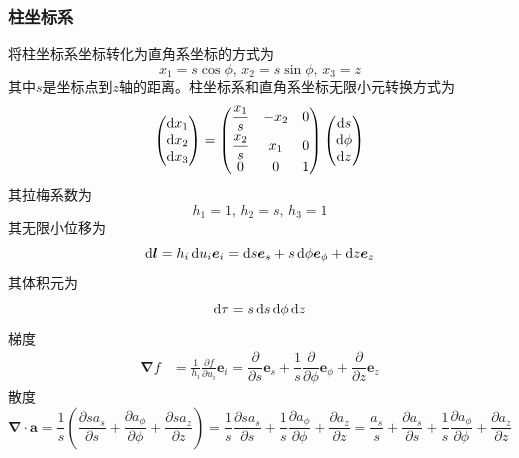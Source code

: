 \subsubsection{柱坐标系}
将柱坐标系坐标转化为直角系坐标的方式为
\begin{equation}
    x_1=s\cos\phi,\, x_2=s\sin\phi,\, x_3=z\label{柱坐标系坐标转化为直角系坐标}
\end{equation}
其中$s$是坐标点到$z$轴的距离。柱坐标系和直角系坐标无限小元转换方式为
\begin{equation}
    \begin{pmatrix}
        \dif{x}_1\\\dif{x}_2\\\dif{x}_3
    \end{pmatrix}=\begin{pmatrix}
        \dfrac{x_1}{s}&-x_2&0\\[6pt]
        \dfrac{x_2}{s}&x_1&0\\0&0&1
    \end{pmatrix}\begin{pmatrix}
        \dif{s}\\\dif{\phi}\\\dif z
    \end{pmatrix}
\end{equation}
其拉梅系数为
\begin{equation}
    h_1=1,\, h_2=s,\, h_3=1
\end{equation}
其无限小位移为
\begin{equation}
    \dif\boldsymbol{l}=h_i\dif{u}_i\boldsymbol{e}_i=\dif{s}\boldsymbol{e}_s+s\dif{\phi}\boldsymbol{e}_\phi+\dif z\boldsymbol{e}_z
\end{equation}
其体积元为
\begin{equation}
    \dif\tau=s\dif s\dif \phi\dif z
\end{equation}
梯度
\begin{align}
    \boldsymbol\nabla f&=\frac{1}{h_i}\frac{\partial f}{\partial u_i}{\boldsymbol e}_i=\dfrac{\partial}{\partial s}\boldsymbol{e}_s+\dfrac{1}{s}\dfrac{\partial}{\partial \phi}\boldsymbol{e}_\phi+\dfrac{\partial}{\partial z}\boldsymbol{e}_z
\end{align}
散度
\begin{equation}
    \boldsymbol{\nabla}\cdot\boldsymbol{a}=\frac{1}{s}(\dfrac{\partial sa_s}{\partial s}+\dfrac{\partial a_{\phi}}{\partial \phi}+\dfrac{\partial sa_{z}}{\partial z})
    =\frac{1}{s}\dfrac{\partial sa_s}{\partial s}+\frac{1}{s}\dfrac{\partial a_{\phi}}{\partial \phi}+\dfrac{\partial a_{z}}{\partial z}
    =\frac{a_s}{s}+\dfrac{\partial a_s}{\partial s}+\frac{1}{s}\dfrac{\partial a_{\phi}}{\partial \phi}+\dfrac{\partial a_{z}}{\partial z}
\end{equation}

